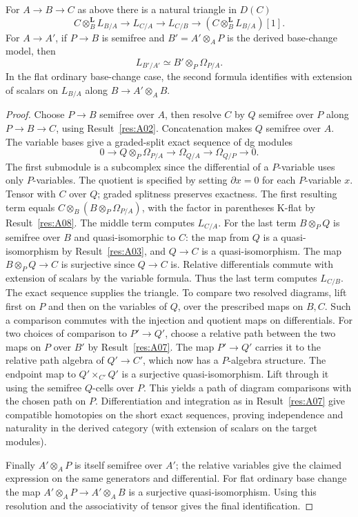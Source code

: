 \begin{theorem}\label{res:A09}
For \(A\to B\to C\) as above there is a natural triangle in \(D(C)\)
\[
 C\otimes_B^{\mathbf L}L_{B/A}\longrightarrow L_{C/A}
 \longrightarrow L_{C/B}\longrightarrow
 (C\otimes_B^{\mathbf L}L_{B/A})[1].
\]
For \(A\to A'\), if \(P\to B\) is semifree and
\(B'=A'\otimes_A P\) is the derived base-change model, then
\[
       L_{B'/A'}\simeq B'\otimes_P \Omega_{P/A}.
\]
In the flat ordinary base-change case, the second formula identifies
with extension of scalars on \(L_{B/A}\) along \(B\to A'\otimes_A B\).
\end{theorem}
\begin{proof}
Choose \(P\to B\) semifree over \(A\), then resolve \(C\) by \(Q\)
semifree over \(P\) along \(P\to B\to C\), using
Result~\ref{res:A02}. Concatenation makes \(Q\) semifree over \(A\).
The variable bases give a graded-split exact sequence of dg modules
\[
 0\longrightarrow Q\otimes_P\Omega_{P/A}
 \longrightarrow \Omega_{Q/A}
 \longrightarrow \Omega_{Q/P}\longrightarrow0 .
\]
The first submodule is a subcomplex since the differential of
a \(P\)-variable uses only \(P\)-variables. The quotient is specified
by setting \(\partial x=0\) for each \(P\)-variable \(x\).
Tensor with \(C\) over \(Q\); graded splitness preserves exactness.
The first resulting term equals
\(C\otimes_B(B\otimes_P\Omega_{P/A})\), with the factor in parentheses
K-flat by Result~\ref{res:A08}. The middle term computes \(L_{C/A}\).
For the last term \(B\otimes_P Q\) is semifree over \(B\) and
quasi-isomorphic to \(C\): the map from \(Q\) is a quasi-isomorphism
by Result~\ref{res:A03}, and \(Q\to C\) is a quasi-isomorphism.
The map \(B\otimes_PQ\to C\) is surjective since \(Q\to C\) is.
Relative differentials commute with extension of scalars by the
variable formula. Thus the last term computes \(L_{C/B}\).
The exact sequence supplies the triangle. To compare two resolved
diagrams, lift first on \(P\) and then on the variables of \(Q\),
over the prescribed maps on \(B,C\). Such a comparison commutes
with the injection and quotient maps on differentials. For two
choices of comparison to \(P'\to Q'\), choose a relative path
between the two maps on \(P\) over \(B'\) by
Result~\ref{res:A07}. The map \(P'\to Q'\) carries it to the
relative path algebra of \(Q'\to C'\), which now has a \(P\)-algebra
structure. The endpoint map to \(Q'\times_{C'}Q'\) is a surjective
quasi-isomorphism. Lift through it using the semifree \(Q\)-cells
over \(P\). This yields a path of diagram comparisons with the
chosen path on \(P\). Differentiation and integration as in
Result~\ref{res:A07} give compatible homotopies on the short exact
sequences, proving independence and naturality in the derived
category (with extension of scalars on the target modules).

Finally \(A'\otimes_A P\) is itself semifree over \(A'\);
the relative variables give the claimed expression on the same
generators and differential. For flat ordinary base change the
map \(A'\otimes_A P\to A'\otimes_A B\) is a surjective
quasi-isomorphism. Using this resolution and the associativity
of tensor gives the final identification.
\end{proof}

